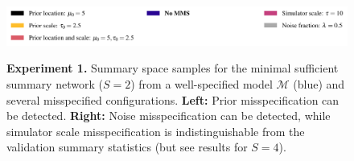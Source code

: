 \documentclass[twoside,11pt]{article}
\newcommand{\numberGaussianMeans}{1}
\newcommand{\0}{\boldsymbol{0}}
\newcommand{\M}{\mathcal{M}}
\begin{document}
\begin{figure}[t]
\begin{subfigure}[t]{0.45\linewidth}
    \end{subfigure}\\
    \includegraphics[width=0.95\linewidth]{plots/abf_mvn_means_sufficient_pairplot_MMD_legend_new.pdf}
    \caption{\textbf{Experiment \numberGaussianMeans.} Summary space samples for the minimal sufficient summary network ($S=2$) from a well-specified model $\M$ (blue) and several misspecified configurations. \textbf{Left:} Prior misspecification can be detected. \textbf{Right:} Noise misspecification can be detected, while simulator scale misspecification is indistinguishable from the validation summary statistics (but see results for $S=4$).}
    \label{fig:mvn:pairplot}
\end{figure}
\end{document}
